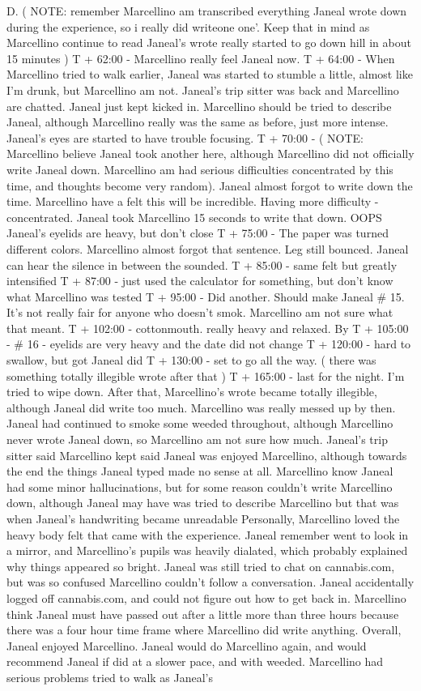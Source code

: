 \documentclass[12pt]{book}
\begin{document}
D. ( NOTE: remember Marcellino am transcribed everything Janeal wrote down during the experience, so i really did writeone one'. Keep that in mind as Marcellino continue to read Janeal's wrote really started to go down hill in about 15 minutes ) T + 62:00 - Marcellino really feel Janeal now. T + 64:00 - When Marcellino tried to walk earlier, Janeal was started to stumble a little, almost like I'm drunk, but Marcellino am not. Janeal's trip sitter was back and Marcellino are chatted. Janeal just kept kicked in. Marcellino should be tried to describe Janeal, although Marcellino really was the same as before, just more intense. Janeal's eyes are started to have trouble focusing. T + 70:00 - ( NOTE: Marcellino believe Janeal took another here, although Marcellino did not officially write Janeal down. Marcellino am had serious difficulties concentrated by this time, and thoughts become very random). Janeal almost forgot to write down the time. Marcellino have a felt this will be incredible. Having more difficulty - concentrated. Janeal took Marcellino 15 seconds to write that down. OOPS Janeal's eyelids are heavy, but don't close T + 75:00 - The paper was turned different colors. Marcellino almost forgot that sentence. Leg still bounced. Janeal can hear the silence in between the sounded. T + 85:00 - same felt but greatly intensified T + 87:00 - just used the calculator for something, but don't know what Marcellino was tested T + 95:00 - Did another. Should make Janeal \# 15. It's not really fair for anyone who doesn't smok. Marcellino am not sure what that meant. T + 102:00 - cottonmouth. really heavy and relaxed. By T + 105:00 - \# 16 - eyelids are very heavy and the date did not change T + 120:00 - hard to swallow, but got Janeal did T + 130:00 - set to go all the way. ( there was something totally illegible wrote after that ) T + 165:00 - last for the night. I'm tried to wipe down. After that, Marcellino's wrote became totally illegible, although Janeal did write too much. Marcellino was really messed up by then. Janeal had continued to smoke some weeded throughout, although Marcellino never wrote Janeal down, so Marcellino am not sure how much. Janeal's trip sitter said Marcellino kept said Janeal was enjoyed Marcellino, although towards the end the things Janeal typed made no sense at all. Marcellino know Janeal had some minor hallucinations, but for some reason couldn't write Marcellino down, although Janeal may have was tried to describe Marcellino but that was when Janeal's handwriting became unreadable Personally, Marcellino loved the heavy body felt that came with the experience. Janeal remember went to look in a mirror, and Marcellino's pupils was heavily dialated, which probably explained why things appeared so bright. Janeal was still tried to chat on cannabis.com, but was so confused Marcellino couldn't follow a conversation. Janeal accidentally logged off cannabis.com, and could not figure out how to get back in. Marcellino think Janeal must have passed out after a little more than three hours because there was a four hour time frame where Marcellino did write anything. Overall, Janeal enjoyed Marcellino. Janeal would do Marcellino again, and would recommend Janeal if did at a slower pace, and with weeded. Marcellino had serious problems tried to walk as Janeal's 
\end{document}
